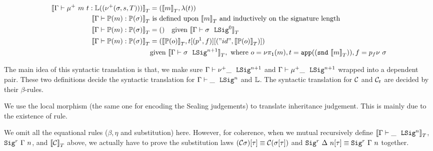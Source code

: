 \begin{align*}
  {{\llbracket {\ensuremath{ {\Gamma} \vdash {\mu^+~m~t} : {\mathbb{L}({(\nu^+({\sigma},{s},{T}))})} }} \rrbracket}_T} &= ({{\llbracket {m} \rrbracket}_T}, \lambda({t})) \\ 
  {{\llbracket {\ensuremath{ {\Gamma} \vdash {\ensuremath{\mathbb{P}({m})}} : {\mathbb{P}({\sigma})} }} \rrbracket}_T} & \text{ is defined upon } {{\llbracket {m} \rrbracket}_T} \text{ and inductively on the signature length} \\ 
  {{\llbracket {\ensuremath{ {\Gamma} \vdash {\ensuremath{\mathbb{P}({m})}} : {\mathbb{P}({\sigma})} }} \rrbracket}_T} &= () \quad \text{given } {{\llbracket {\ensuremath{ {\Gamma} \vdash {\sigma} \ \ \texttt{LSig}^{0} }} \rrbracket}_T} \\
  {{\llbracket {\ensuremath{ {\Gamma} \vdash {\ensuremath{\mathbb{P}({m})}} : {\mathbb{P}({\sigma})} }} \rrbracket}_T} &= 
  ({{\llbracket {\ensuremath{\mathbb{P}({o})}} \rrbracket}_T}, t[({p^1},{f})][({"id"},{{{\llbracket {\ensuremath{\mathbb{P}({o})}} \rrbracket}_T}})]) \\
  & \text{given } {{\llbracket {\ensuremath{ {\Gamma} \vdash {\sigma} \ \ \texttt{LSig}^{n+1} }} \rrbracket}_T}, \text{ where } o = \nu\pi_{\texttt{1}}({m}), t = \texttt{app}({(\texttt{snd}~{{{\llbracket {m} \rrbracket}_T}})}), f = p_f\nu~\sigma 
\end{align*}



The main idea of this syntactic translation is that, we make sure
$ {\Gamma} \vdash {\nu^+ \_ } \ \ \texttt{LSig}^{n+1} $ and $ {\Gamma} \vdash {\mu^+ \_} \ \ \texttt{LSig}^{n+1} $
wrapped into a dependent pair. These two definitions decide the
syntactic translation for $ {\Gamma} \vdash {\_} \ \ \texttt{LSig}^{n} $ and $\mathbb{L}$. The
syntactic translation for $\mathcal{C}$ and $\mathcal{C}_t$ are decided by their
$\beta$-rules. 

We use the local morphism\cite{abbott2003category} (the same one for encoding the Sealing
judgements) to translate inheritance judgement. This is mainly due to
the existence of  rule. 

We omit all the equational rules ($\beta,\eta$ and substitution) here.
However, for coherence, when we mutual recursively define
${{\llbracket {\ensuremath{ {\Gamma} \vdash {\_} \ \ \texttt{LSig}^{n} }} \rrbracket}_T}$, ${{ \texttt{Sig}^r~{\Gamma}~{n} }} $, and
${{\llbracket {\ensuremath{\mathcal{C}}} \rrbracket}_T}$ above, we actually have to prove the substitution laws
$(\mathcal{C}\sigma)[\tau]\equiv \mathcal{C}(\sigma[\tau])$ and ${ \texttt{Sig}^r~{\Delta}~{n} }[\tau]
\equiv {\ensuremath{ \texttt{Sig}^r~{\Gamma}~{n} }}$ together. 


